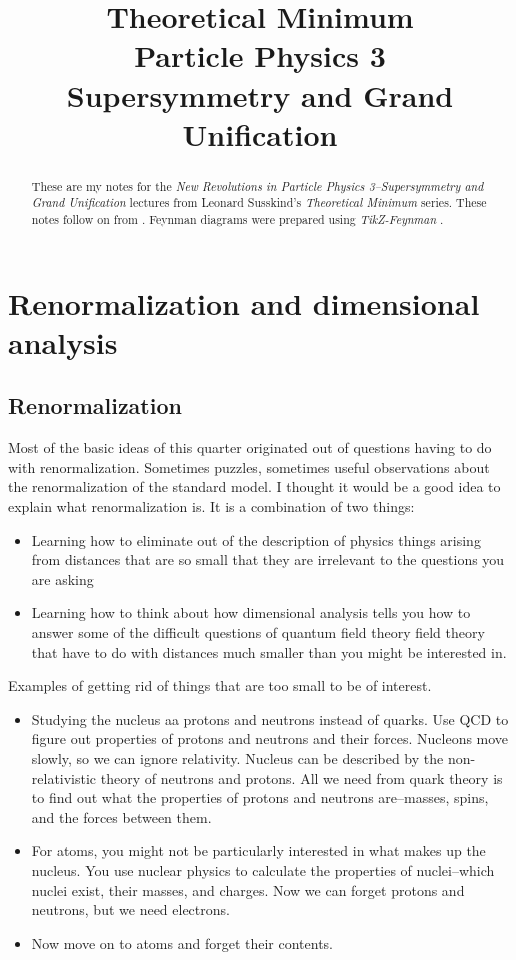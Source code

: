 \documentclass[]{article}
\title{Theoretical Minimum\\Particle Physics 3\\Supersymmetry and Grand Unification}
\author{}
\begin{document}
\maketitle

\begin{abstract}
	These are my notes for the \emph{New Revolutions in Particle Physics 3--Supersymmetry and Grand Unification}\cite{susskind2010supersymmetry} lectures from Leonard Susskind's \emph{Theoretical Minimum} series\cite{susskind2007theoretical}. These notes follow on from \cite{susskind2010standard}. Feynman diagrams were prepared using \emph{TikZ-Feynman} \cite{ellis2016tikz}.
\end{abstract}

\tableofcontents
\listoffigures
\listoftables
\listoftheorems

\section{Renormalization  and dimensional analysis}

\subsection{Renormalization}

Most of the basic ideas of this quarter originated out of questions having to do with renormalization. Sometimes puzzles, sometimes useful observations about the renormalization of the standard model. I thought it would be a good idea to explain what renormalization is. It  is a combination of two things:
\begin{itemize}
	\item Learning how to eliminate out of the description of physics things arising from distances that are so small that they are irrelevant to the questions you are asking
	\item Learning how to think about how dimensional analysis tells you how to answer some of the difficult questions of quantum field theory field theory that have to do with distances much smaller than you might be interested in.
\end{itemize}

Examples of getting rid of things that are too small to be of interest.
\begin{itemize}
	\item Studying the nucleus aa protons and neutrons instead of quarks. Use QCD to figure out properties of protons and neutrons and their forces. Nucleons move slowly, so we can ignore relativity. Nucleus can be described by the non-relativistic theory of neutrons and protons. All we need from quark theory is to find out what the properties of protons and neutrons are--masses, spins, and the forces between them.
	\item For atoms, you might not be particularly interested in what makes up the nucleus. You use nuclear physics to calculate the properties of nuclei--which nuclei exist, their masses, and charges. Now we can forget protons and neutrons, but we need electrons.
	\item Now move on to atoms and forget their contents.
\end{itemize}
\end{document}
